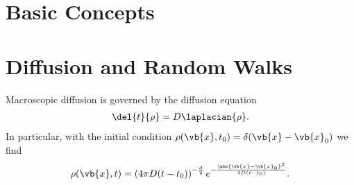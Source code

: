 \section{Basic Concepts}

\section{Diffusion and Random Walks}
Macroscopic diffusion is governed by the diffusion equation
\begin{align*}
	\del{t}{\rho} = D\laplacian{\rho}.
\end{align*}
In particular, with the initial condition $\rho(\vb{x}, t_{0}) = \delta(\vb{x} - \vb{x}_{0})$ we find
\begin{align*}
	\rho(\vb{x}, t) = \left(4\pi D(t - t_{0})\right)^{-\frac{d}{2}}e^{-\frac{\abs{\vb{x} - \vb{x}_{0}}^{2}}{4D(t - t_{0})}}.
\end{align*}

